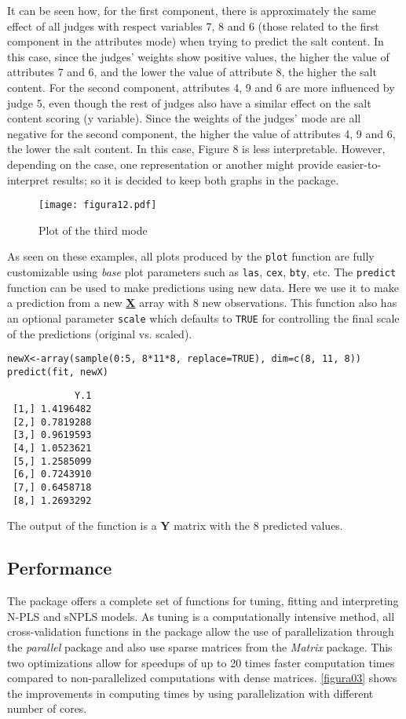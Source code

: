 It can be seen how, for the first component, there is approximately the same effect of all judges with respect variables 7, 8 and 6 (those related to the first component in the attributes mode) when trying to predict the salt content. In this case, since the judges’ weights show positive values, the higher the value of attributes 7 and 6, and the lower the value of attribute 8, the higher the salt content. For the second component, attributes 4, 9 and 6 are more influenced by judge 5, even though the rest of judges also have a similar effect on the salt content scoring (y variable). Since the weights of the judges’ mode are all negative for the second component, the higher the value of attributes 4, 9 and 6, the lower the salt content. In this case, Figure 8 is less interpretable. However, depending on the case, one representation or another might provide easier-to-interpret results; so it is decided to keep both graphs in the package.

\begin{figure}[!ht]
	\centering
\texttt{[image: figura12.pdf]}
\caption{Plot of the third mode}
\label{figura12}
\end{figure}

As seen on these examples, all plots produced by the \texttt{plot} function are fully customizable using \textit{base} plot parameters such as \texttt{las}, \texttt{cex}, \texttt{bty}, etc.
\vspace{15px}
The \texttt{predict} function can be used to make predictions using new data. Here we use it to make a prediction from a new \textbf{\underline{X}} array with 8 new observations. This function also has an optional parameter \texttt{scale} which defaults to \texttt{TRUE} for controlling the final scale of the predictions (original vs. scaled).

\begin{verbatim}
newX<-array(sample(0:5, 8*11*8, replace=TRUE), dim=c(8, 11, 8))
predict(fit, newX)
\end{verbatim}
\begin{verbatim}
            Y.1
 [1,] 1.4196482
 [2,] 0.7819288
 [3,] 0.9619593
 [4,] 1.0523621
 [5,] 1.2585099
 [6,] 0.7243910
 [7,] 0.6458718
 [8,] 1.2693292
\end{verbatim}

The output of the function is a \textbf{Y} matrix with the 8 predicted values.

\subsection{Performance}
The package offers a complete set of functions for tuning, fitting and interpreting N-PLS and sNPLS models. As tuning is a computationally intensive method, all cross-validation functions in the package allow the use of parallelization through the \textit{parallel} package and also use sparse matrices from the \textit{Matrix} package. This two optimizations allow for speedups of up to 20 times faster computation times compared to non-parallelized computations with dense matrices. \autoref{figura03} shows the improvements in computing times by using parallelization with different number of cores.

